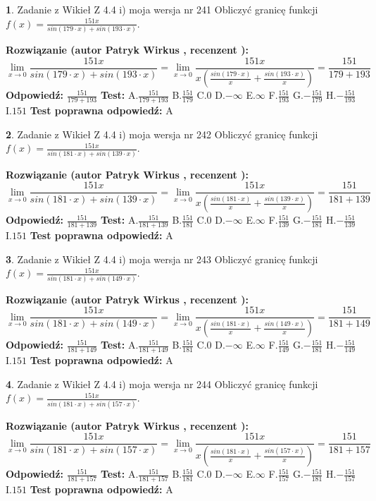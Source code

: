 \documentclass[12pt, a4paper]{article}
\theoremstyle{definition} %
\newtheorem{zad}{}
\newcommand{\zadStart}[1]{\begin{zad}#1\newline}
\newcommand{\zadStop}{\end{zad}}
\newcommand{\rozwStart}[2]{\noindent \textbf{Rozwiązanie (autor #1 , recenzent #2): }\newline}
\newcommand{\rozwStop}{\newline}
\newcommand{\odpStart}{\noindent \textbf{Odpowiedź:}\newline}
\newcommand{\odpStop}{\newline}
\newcommand{\testStart}{\noindent \textbf{Test:}\newline}
\newcommand{\testStop}{\newline}
\newcommand{\kluczStart}{\noindent \textbf{Test poprawna odpowiedź:}\newline}
\newcommand{\kluczStop}{\newline}
\begin{document}
\zadStart{Zadanie z Wikieł Z 4.4 i) moja wersja nr 241}
Obliczyć granicę funkcji $f(x)=\frac{151x}{sin(179\cdot x) +sin(193\cdot x)}$.
\zadStop
\rozwStart{Patryk Wirkus}{}
$$\lim\limits_{x\to 0}\frac{151x}{sin(179\cdot x) +sin(193\cdot x)}=\lim\limits_{x\to 0}\frac{151x}{x(\frac{sin(179\cdot x)}{x}+\frac{sin(193\cdot x)}{x})}=\frac{151}{179+193}$$
\rozwStop
\odpStart
$\frac{151}{179+193}$
\odpStop
\testStart
A.$\frac{151}{179+193}$
B.$\frac{151}{179}$
C.$0$
D.$-\infty$
E.$\infty$
F.$\frac{151}{193}$
G.$-\frac{151}{179}$
H.$-\frac{151}{193}$
I.$151$
\testStop
\kluczStart
A
\kluczStop



\zadStart{Zadanie z Wikieł Z 4.4 i) moja wersja nr 242}
Obliczyć granicę funkcji $f(x)=\frac{151x}{sin(181\cdot x) +sin(139\cdot x)}$.
\zadStop
\rozwStart{Patryk Wirkus}{}
$$\lim\limits_{x\to 0}\frac{151x}{sin(181\cdot x) +sin(139\cdot x)}=\lim\limits_{x\to 0}\frac{151x}{x(\frac{sin(181\cdot x)}{x}+\frac{sin(139\cdot x)}{x})}=\frac{151}{181+139}$$
\rozwStop
\odpStart
$\frac{151}{181+139}$
\odpStop
\testStart
A.$\frac{151}{181+139}$
B.$\frac{151}{181}$
C.$0$
D.$-\infty$
E.$\infty$
F.$\frac{151}{139}$
G.$-\frac{151}{181}$
H.$-\frac{151}{139}$
I.$151$
\testStop
\kluczStart
A
\kluczStop



\zadStart{Zadanie z Wikieł Z 4.4 i) moja wersja nr 243}
Obliczyć granicę funkcji $f(x)=\frac{151x}{sin(181\cdot x) +sin(149\cdot x)}$.
\zadStop
\rozwStart{Patryk Wirkus}{}
$$\lim\limits_{x\to 0}\frac{151x}{sin(181\cdot x) +sin(149\cdot x)}=\lim\limits_{x\to 0}\frac{151x}{x(\frac{sin(181\cdot x)}{x}+\frac{sin(149\cdot x)}{x})}=\frac{151}{181+149}$$
\rozwStop
\odpStart
$\frac{151}{181+149}$
\odpStop
\testStart
A.$\frac{151}{181+149}$
B.$\frac{151}{181}$
C.$0$
D.$-\infty$
E.$\infty$
F.$\frac{151}{149}$
G.$-\frac{151}{181}$
H.$-\frac{151}{149}$
I.$151$
\testStop
\kluczStart
A
\kluczStop



\zadStart{Zadanie z Wikieł Z 4.4 i) moja wersja nr 244}
Obliczyć granicę funkcji $f(x)=\frac{151x}{sin(181\cdot x) +sin(157\cdot x)}$.
\zadStop
\rozwStart{Patryk Wirkus}{}
$$\lim\limits_{x\to 0}\frac{151x}{sin(181\cdot x) +sin(157\cdot x)}=\lim\limits_{x\to 0}\frac{151x}{x(\frac{sin(181\cdot x)}{x}+\frac{sin(157\cdot x)}{x})}=\frac{151}{181+157}$$
\rozwStop
\odpStart
$\frac{151}{181+157}$
\odpStop
\testStart
A.$\frac{151}{181+157}$
B.$\frac{151}{181}$
C.$0$
D.$-\infty$
E.$\infty$
F.$\frac{151}{157}$
G.$-\frac{151}{181}$
H.$-\frac{151}{157}$
I.$151$
\testStop
\kluczStart
A
\kluczStop
\end{document}

